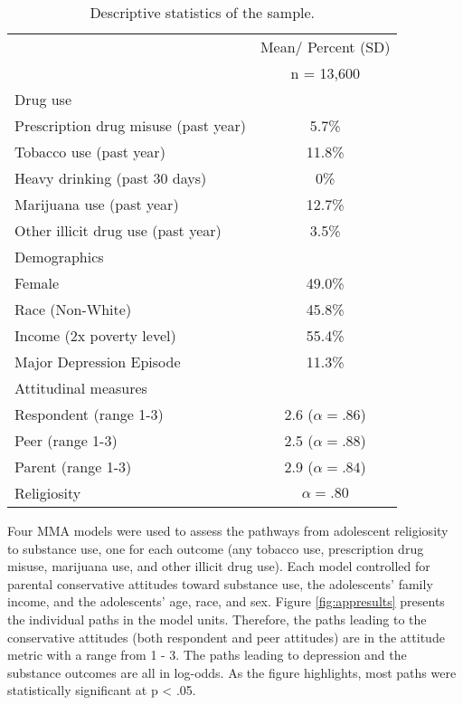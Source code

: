 \documentclass[]{DissertateUSU}
\begin{document}
\begin{table}[ htb ] 
\centering 
\caption{Descriptive statistics of the sample.}
\begin{tabular}{ lc }
\toprule
  & Mean/ Percent (SD) \\ 
  & n = 13,600 \\ 
\midrule
Drug use & \\
\hspace{6pt} Prescription drug misuse (past year) & 5.7\% \\ 
\hspace{6pt} Tobacco use (past year)              & 11.8\% \\ 
\hspace{6pt} Heavy drinking (past 30 days)        & 0\% \\ 
\hspace{6pt} Marijuana use (past year)            & 12.7\% \\ 
\hspace{6pt} Other illicit drug use (past year)   & 3.5\% \\ 
Demographics & \\
\hspace{6pt} Female                    & 49.0\% \\ 
\hspace{6pt} Race (Non-White)          & 45.8\% \\ 
\hspace{6pt} Income (2x poverty level) & 55.4\% \\ 
Major Depression Episode               & 11.3\% \\ 
Attitudinal measures & \\
\hspace{6pt} Respondent (range 1-3) & 2.6 ($\alpha = .86$) \\ 
\hspace{6pt} Peer (range 1-3)       & 2.5 ($\alpha = .88$) \\ 
\hspace{6pt} Parent (range 1-3)     & 2.9 ($\alpha = .84$) \\ 
Religiosity & $\alpha = .80$ \\ 
\bottomrule
\end{tabular}\label{tab:table1}
\end{table}

Four MMA models were used to assess the pathways from adolescent
religiosity to substance use, one for each outcome (any tobacco use,
prescription drug misuse, marijuana use, and other illicit drug use).
Each model controlled for parental conservative attitudes toward
substance use, the adolescents' family income, and the adolescents' age,
race, and sex. Figure \ref{fig:appresults} presents the individual paths
in the model units. Therefore, the paths leading to the conservative
attitudes (both respondent and peer attitudes) are in the attitude
metric with a range from 1 - 3. The paths leading to depression and the
substance outcomes are all in log-odds. As the figure highlights, most
paths were statistically significant at p \textless{} .05.
\end{document}
